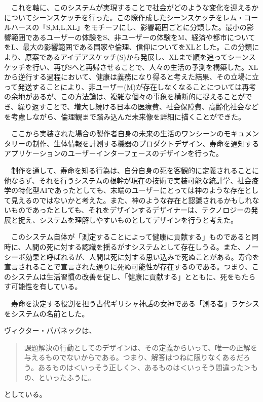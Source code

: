 　これを軸に、このシステムが実現することで社会がどのような変化を迎えるかについてシーンスケッチを行った。この際作成したシーンスケッチをレム・コールハースの「S,M,L,XL」をモチーフにし、影響範囲ごとに分類した。最小の影響範囲であるユーザーの体験をS、非ユーザーの体験をM、経済や都市についてをL、最大の影響範囲である国家や倫理、信仰についてをXLとした。この分類により、原案であるアイデアスケッチ(S)から発展し、XLまで順を追ってシーンスケッチを行い、再びSへと再帰させることで、人々の生活の予測を構築した。XLから逆行する過程において、健康は義務になり得ると考えた結果、その立場に立って発送することにより、非ユーザー(M)が存在しなくなることについては再考の余地があるが、この方法論は、複雑な個々の事象を横断的に捉えることができ、繰り返すことで、増大し続ける日本の医療費、社会保障費、高齢化社会などを考慮しながら、倫理観まで踏み込んだ未来像を詳細に描くことができた。

　ここから実装された場合の製作者自身の未来の生活のワンシーンのモキュメンタリーの制作、生体情報を計測する機器のプロダクトデザイン、寿命を通知するアプリケーションのユーザーインターフェースのデザインを行った。

　制作を通して、寿命を知る行為は、自分自身の死を客観的に定義されることに他ならず、それを行うシステムの根幹が現在の技術で実装可能な統計学、社会疫学の特化型AIであったとしても、末端のユーザーにとっては神のような存在として見えるのではないかと考えた。また、神のような存在と認識されるかもしれないものであったとしても、それをデザインするデザイナーは、テクノロジーの発展と捉え、システムを理解しやすいものとしてデザインを行うと考えた。

　このシステム自体が「測定することによって健康に貢献する」ものであると同時に、人間の死に対する認識を揺るがすシステムとして存在しうる。また、ノーシーボ効果と呼ばれるが、人間は死に対する思い込みで死ぬことがある。寿命を宣言されることで宣言された通りに死ぬ可能性が存在するのである。つまり、このシステムは生活習慣の改善を促し、「健康に貢献する」とともに、死をもたらす可能性を有している。

　寿命を決定する役割を担う古代ギリシャ神話の女神である「測る者」ラケシスをシステムの名前とした。



ヴィクター・パパネックは、
\begin{quotation}
  課題解決の行動としてのデザインは、その定義からいって、唯一の正解を与えるものでないからである。つまり、解答はつねに限りなくあるだろう。あるものは＜いっそう正しく＞、あるものは＜いっそう間違った＞もの、といったふうに。
\end{quotation}
としている。
